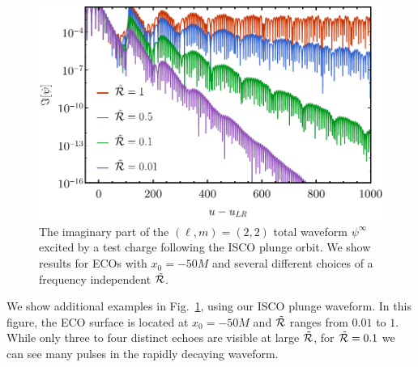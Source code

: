 \begin{refsection}
\begin{figure}[t]
\includegraphics[width = 1 \columnwidth]{chapter_echo/etc/difrefechosumplot}
\caption{The imaginary part of the $(\ell,m)=(2,2)$ total waveform $\psi^\infty$ excited by a test charge following the ISCO plunge orbit.
We show results for ECOs with $x_0 =-50 M$ and several different choices of a frequency independent $\tilde{\mathcal R}$.}
\label{fig:EsumManyRb}
\end{figure}

We show additional examples in Fig.~\ref{fig:EsumManyRb}, using our ISCO plunge waveform. In this figure, the ECO surface is located at $x_0=-50 M$ and $\tilde{\mathcal R}$ ranges from $0.01$ to $1$. While only three to four distinct echoes are visible at large $\tilde{\mathcal R}$, for $
\tilde{\mathcal R} = 0.1$ we can see many pulses in the rapidly decaying waveform.


\end{refsection}
